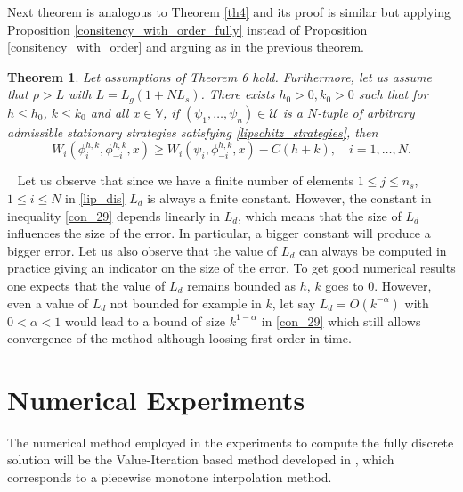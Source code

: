 \documentclass[12pt]{article}
\newtheorem{theorem}{Theorem}
\newcounter{remark}
\def\theremark {\arabic{remark}}
\newenvironment{remark}{\refstepcounter{remark}\par\noindent{\bf Remark\ \theremark}\ }{\par}
\begin{document}
Next theorem is analogous to Theorem \ref{th4} and its proof is similar but applying  Proposition \ref{consitency_with_order_fully}
instead of Proposition \ref{consitency_with_order} and arguing as in the previous theorem.
\begin{theorem}
Let assumptions of Theorem 6 hold. Furthermore, let us assume that $\rho>L$ with
$L=L_g(1+NL_s)$. There exists $h_0>0, k_0>0$ such that for $h\le h_0$, $k\le k_0$  and all $x\in\mathbb{V}$, if $(\psi_1,\dots,\psi_n)\in\mathcal{U}$ is a $N$-tuple of arbitrary admissible stationary strategies satisfying \eqref{lipschitz_strategies}, then
\begin{equation*}
W_i(\phi_i^{h,k},\phi_{-i}^{h,k},x)\ge W_i(\psi_i,\phi_{-i}^{h,k},x)-C(h+k),\quad i=1,\dots, N.
\end{equation*}\end{theorem}
\begin{remark}
Let us observe that since we have a finite number of elements $1\le j\le n_s$, $1\le i\le N$ in \eqref{lip_dis}
$L_d$ is always a finite constant. However, the constant in inequality \eqref{con_29} depends linearly
in $L_d$, which means that the size of $L_d$ influences the size of the error. In particular, a bigger constant will produce a bigger error. Let us also observe that the value of $L_d$ can always be computed in practice
giving an indicator on the size of the error. To get good numerical results one expects that the value of $L_d$ remains bounded as $h$, $k$ goes to $0$. However, even a value of $L_d$ not bounded for example in $k$, let say $L_d=O(k^{-\alpha})$ with $0<\alpha<1$ would lead to a bound of size
$k^{1-\alpha}$ in \eqref{con_29} which still allows convergence of the method although loosing  first order in time.
\end{remark}
\section{Numerical Experiments}


The numerical method employed in the experiments to compute the fully discrete solution will be the Value-Iteration based method developed in \cite[Appendix C]{DeFrutos2016}, which corresponds to a piecewise monotone interpolation method.
\end{document}
